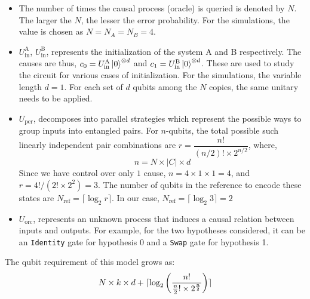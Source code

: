 \documentclass[%
 aps,
 jmp,%
 amsmath,amssymb,
 reprint,%
]{revtex4-2}
\DeclarePairedDelimiter{\ceil}{\lceil}{\rceil}
\begin{document}
\begin{itemize}
    
    \item The number of times the causal process (oracle) is queried is denoted by $N$. 
    The larger the $N$, the lesser the error probability. 
    For the simulations, the value is chosen as $N = N_A = N_B = 4$.
    
    \item $U_\textrm{in}^\textrm{A}$, $U_\textrm{in}^\textrm{B}$, represents the initialization of the system A and B respectively. 
    The causes are thus, $c_0 = U_\textrm{in}^\textrm{A} \ket{0}^{\otimes d}$ and $c_1 = U_\textrm{in}^\textrm{B} \ket{0}^{\otimes d}$. 
    These are used to study the circuit for various cases of initialization.
    For the simulations, the variable length $d=1$. 
    For each set of $d$ qubits among the $N$ copies, the same unitary needs to be applied. 

    \item $U_\textrm{per}$, decomposes into parallel strategies which represent the possible ways to group inputs into entangled pairs.
For $n$-qubits, the total possible such linearly independent pair combinations are $r = \dfrac{n!}{(n/2)! \times 2^{n/2}}$, where,
\begin{equation}
    n = N\times|C|\times d
\end{equation}
Since we have control over only $1$ cause, $n = 4\times1\times1 = 4$, and $r = 4!/(2!\times2^2) = 3$.
The number of qubits in the reference to encode these states are $N_{\textrm{ref}} = \lceil\log_2 r \rceil$. In our case, $N_{\textrm{ref}} = \lceil \log_2 3 \rceil = 2$

    \item $U_\textrm{orc}$, represents an unknown process that induces a causal relation between inputs and outputs.
    For example, for the two hypotheses considered, it can be an \texttt{Identity} gate for hypothesis 0 and a \texttt{Swap} gate for hypothesis 1.
\end{itemize}
The qubit requirement of this model grows as:
\begin{equation}
N \times k \times d + \ceil{\log_2 \left( \dfrac{n!}{\frac{n}{2}! \times 2^{\frac{n}{2}}} \right)}
\label{eq:qubit-requirement}
\end{equation}
\end{document}
